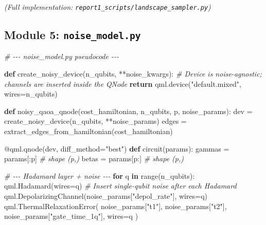 \documentclass[
  11pt,
]{report}
\newenvironment{Shaded}{}{}
\newcommand{\AttributeTok}[1]{\textcolor[rgb]{0.49,0.56,0.16}{#1}}
\newcommand{\BuiltInTok}[1]{\textcolor[rgb]{0.00,0.50,0.00}{#1}}
\newcommand{\CommentTok}[1]{\textcolor[rgb]{0.38,0.63,0.69}{\textit{#1}}}
\newcommand{\ControlFlowTok}[1]{\textcolor[rgb]{0.00,0.44,0.13}{\textbf{#1}}}
\newcommand{\KeywordTok}[1]{\textcolor[rgb]{0.00,0.44,0.13}{\textbf{#1}}}
\newcommand{\NormalTok}[1]{#1}
\newcommand{\OperatorTok}[1]{\textcolor[rgb]{0.40,0.40,0.40}{#1}}
\newcommand{\StringTok}[1]{\textcolor[rgb]{0.25,0.44,0.63}{#1}}
\begin{document}
\emph{(Full implementation:
\texttt{report1\_scripts/landscape\_sampler.py})}

\subsection{\texorpdfstring{Module 5:
\texttt{noise\_model.py}}{Module 5: noise\_model.py}}\label{module-5-noise_model.py}

\begin{Shaded}
\begin{Highlighting}[]
\CommentTok{\# {-}{-}{-} noise\_model.py pseudocode {-}{-}{-}}

\KeywordTok{def}\NormalTok{ create\_noisy\_device(n\_qubits, }\OperatorTok{**}\NormalTok{noise\_kwargs):}
    \CommentTok{\# Device is noise{-}agnostic; channels are inserted inside the QNode}
    \ControlFlowTok{return}\NormalTok{ qml.device(}\StringTok{"default.mixed"}\NormalTok{, wires}\OperatorTok{=}\NormalTok{n\_qubits)}


\KeywordTok{def}\NormalTok{ noisy\_qaoa\_qnode(cost\_hamiltonian, n\_qubits, p, noise\_params):}
\NormalTok{    dev }\OperatorTok{=}\NormalTok{ create\_noisy\_device(n\_qubits, }\OperatorTok{**}\NormalTok{noise\_params)}
\NormalTok{    edges }\OperatorTok{=}\NormalTok{ extract\_edges\_from\_hamiltonian(cost\_hamiltonian)}

    \AttributeTok{@qml.qnode}\NormalTok{(dev, diff\_method}\OperatorTok{=}\StringTok{"best"}\NormalTok{)}
    \KeywordTok{def}\NormalTok{ circuit(params):}
\NormalTok{        gammas }\OperatorTok{=}\NormalTok{ params[:p]                                   }\CommentTok{\# shape (p,)}
\NormalTok{        betas }\OperatorTok{=}\NormalTok{ params[p:]                                    }\CommentTok{\# shape (p,)}

        \CommentTok{\# {-}{-}{-} Hadamard layer + noise {-}{-}{-}}
        \ControlFlowTok{for}\NormalTok{ q }\KeywordTok{in} \BuiltInTok{range}\NormalTok{(n\_qubits):}
\NormalTok{            qml.Hadamard(wires}\OperatorTok{=}\NormalTok{q)}
            \CommentTok{\# Insert single{-}qubit noise after each Hadamard}
\NormalTok{            qml.DepolarizingChannel(noise\_params[}\StringTok{"depol\_rate"}\NormalTok{], wires}\OperatorTok{=}\NormalTok{q)}
\NormalTok{            qml.ThermalRelaxationError(}
\NormalTok{                noise\_params[}\StringTok{"t1"}\NormalTok{], noise\_params[}\StringTok{"t2"}\NormalTok{],}
\NormalTok{                noise\_params[}\StringTok{"gate\_time\_1q"}\NormalTok{], wires}\OperatorTok{=}\NormalTok{q}
\NormalTok{            )}


\end{Highlighting}
\end{Shaded}
\end{document}
